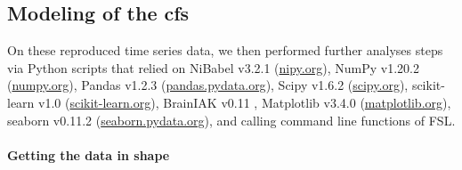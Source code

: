 \subsection{Modeling of the \ac{cfs}}

On these reproduced time series data, we then performed further analyses steps
via Python scripts that relied on
%
NiBabel v3.2.1 (\href{https://nipy.org}{\url{nipy.org}}),
%
NumPy v1.20.2 (\href{https://numpy.org}{\url{numpy.org}}),
%
Pandas v1.2.3 (\href{https://pandas.pydata.org}{\url{pandas.pydata.org}}),
%
Scipy v1.6.2 (\href{https://scipy.org}{\url{scipy.org}}),
%
scikit-learn v1.0 (\href{https://scikit-learn.org}{\url{scikit-learn.org}}),
%
BrainIAK v0.11
\citep[\href{https://brainiak.org}{\url{brainiak.org}}][]{kumar2020brainiak,
kumar2020brainiaktutorial},
%
Matplotlib v3.4.0 (\href{https://matplotlib.org}{\url{matplotlib.org}}),
%
seaborn v0.11.2 (\href{https://seaborn.pydata.org}{\url{seaborn.pydata.org}}),
%
and calling command line functions of FSL.








\paragraph{Getting the data in shape}


